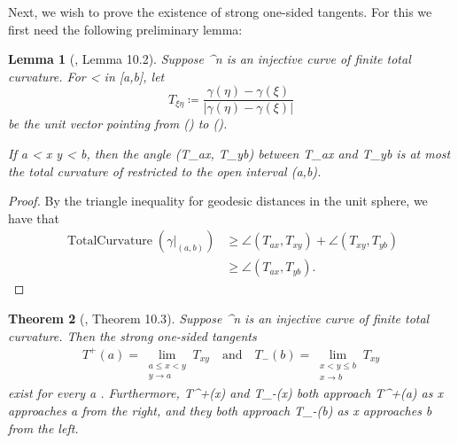 \documentclass[a4paper, 11pt]{article}
\theoremstyle{plain}
\newtheorem{theorem}{Theorem}[section]
\newtheorem{lemma}[theorem]{Lemma}
\theoremstyle{definition}
\theoremstyle{remark}
\numberwithin{equation}{subsection}
\def\({}
\def\){}
\begin{document}
Next, we wish to prove the existence of strong one-sided tangents. For this we first need the following preliminary lemma:

\begin{lemma}[{\cite{EWW02}, Lemma 10.2}]
\label{Existence of Strong One-sided Tangents}
Suppose \(\gamma \vcentcolon [a,b] \rightarrow {}^{n}\) is an injective curve of finite total curvature. For \(\xi < \eta\) in \([a,b]\), let
\[T_{\xi \eta} \coloneq \frac{\gamma(\eta) - \gamma(\xi)}{|\gamma(\eta) - \gamma(\xi)|}\]
be the unit vector pointing from \(\gamma(\xi)\) to \(\gamma(\eta)\).

If \(a < x \leqslant y < b\), then the angle \(\angle(T_{ax}, T_{yb})\) between \(T_{ax}\) and \(T_{yb}\) is at most the total curvature of \(\gamma\) restricted to the open interval \((a,b)\).
\end{lemma}

  
\begin{proof}
By the triangle inequality for geodesic distances in the unit sphere, we have that
\begin{align*}
\operatorname{TotalCurvature}(\gamma\vert_{(a,b)}) &\geqslant \angle(T_{ax}, T_{xy}) + \angle(T_{xy}, T_{yb}) \\
&\geqslant \angle(T_{ax}, T_{yb}).
\end{align*}
\end{proof}



\begin{theorem}[{\cite{EWW02}, Theorem 10.3}]
Suppose \(\gamma \vcentcolon [A,B] \rightarrow {}^{n}\) is an injective curve of finite total curvature. Then the strong one-sided tangents
\begin{gather}
T^{+}(a) = \lim_{\substack{a \leqslant x < y \\ y \rightarrow a}} T_{xy} \quad \text{and} \quad T_{-}(b) = \lim_{\substack{x < y \leqslant b \\ x \rightarrow b}} T_{xy}
\end{gather}
exist for every \(a \in [A, B)\) and every \(b \in (A,B]\). Furthermore, \(T^{+}(x)\) and \(T_{-}(x)\) both approach \(T^{+}(a)\) as \(x\) approaches \(a\) from the right, and they both approach \(T_{-}(b)\) as \(x\) approaches \(b\) from the left.
\end{theorem}
\end{document}
